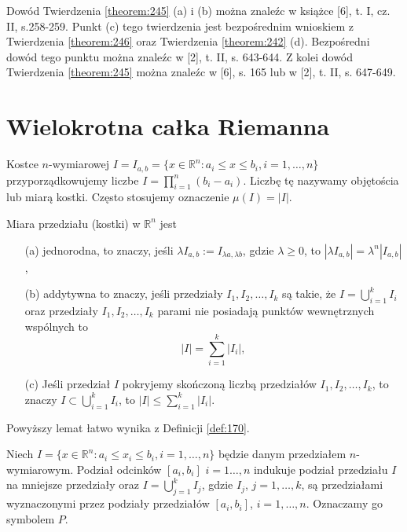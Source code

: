 \documentclass[leqno]{article}
\begin{document}
\begin{justify}
Dowód Twierdzenia \ref{theorem:245} (a) i (b) można znaleźc w książce [6], t. I, cz. II, s.258-259. Punkt (c) tego twierdzenia jest
bezpośrednim wnioskiem z Twierdzenia \ref{theorem:246} oraz Twierdzenia \ref{theorem:242} (d). Bezpośredni dowód tego punktu można znaleźc w [2], t. II, s. 643-644.
Z kolei dowód Twierdzenia \ref{theorem:245} można znaleźc w [6], s. 165 lub w [2], t. II, s. 647-649.

\newpage

\section{Wielokrotna całka Riemanna}

\begin{defn}
    Kostce $n$-wymiarowej $I = I_{a,b} = \{x \in \mathbb{R}^n : a_i \leqslant x \leqslant b_i, i = 1, \ldots, n\}$
    przyporządkowujemy liczbe $I = \prod_{i=1}^{n}(b_i - a_i)$. Liczbę tę nazywamy objętościa lub miarą kostki. Często stosujemy oznaczenie 
    $\mu(I) = |I|$.
\end{defn}

\begin{lemat}
{
    Miara przedziału (kostki) w $\mathbb{R}^n$ jest 
    \begin{itemize}
        \item [(a)] jednorodna, to znaczy, jeśli $\lambda I_{a,b} := I_{\lambda a, \lambda b}$, gdzie $\lambda \geqslant 0$, to $|\lambda I_{a,b}| = \lambda^{n} |I_{a,b}|$,
        \item [(b)] addytywna to znaczy, jeśli przedziały $I_1, I_2, \ldots, I_k$ są takie, że $I = \bigcup_{i=1}^{k}I_i$ oraz przedziały $I_1, I_2, \ldots, I_k$ parami nie
            posiadają punktów wewnętrznych wspólnych to 
            \[
                |I| = \sum_{i=1}^{k}|I_i|,
            \]
        \item [(c)]
            Jeśli przedział $I$ pokryjemy skończoną liczbą przedziałów $I_1, I_2, \ldots, I_k$, to znaczy $I \subset \bigcup_{i=1}^{k}I_i$, to $|I| \leqslant \sum_{i=1}^{k}|I_i|$.
    \end{itemize}
}
\end{lemat}

Powyższy lemat łatwo wynika z Definicji \ref{def:170}.

\begin{defn}
    Niech $I = \{x \in \mathbb{R}^n : a_i \leqslant x_i \leqslant b_i, i = 1, \ldots, n\}$ będzie danym przedziałem $n$-wymiarowym.
    Podział odcinków $[a_i, b_i]$ $i = 1 \ldots, n$ indukuje podział przedziału $I$ na mniejsze przedziały oraz 
    $I = \bigcup_{j=1}^{k}I_j$, gdzie $I_j$, $j=1, \ldots, k$, są przedziałami wyznaczonymi przez podziały przedziałów $[a_i, b_i]$, $i = 1, \ldots, n$. Oznaczamy go
    symbolem $P$.


\end{defn}
\end{justify}
\end{document}
